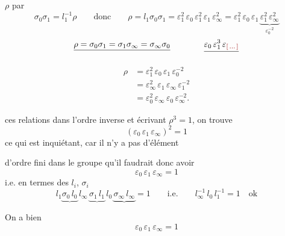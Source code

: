 \documentclass[11pt,a4paper]{article}
\begin{document}
 $\rho$ \struck{\ill{}} par
\[
\sigma_0 \sigma_1 = l_1^{-1} \rho \qquad \text{donc} \qquad
\rho = l_1 \sigma_0 \sigma_1
= \varepsilon_1^2\, \varepsilon_0\, \varepsilon_1^2\, \varepsilon_1\, \varepsilon_\infty^2
= \varepsilon_1^2\, \varepsilon_0\, \varepsilon_1\, \underbrace{\varepsilon_1^2\, \varepsilon_\infty^2}_{\varepsilon_0^{-2}}
\]
\[
\struck{\rho = \sigma_0\sigma_1 = \sigma_1\sigma_\infty = \sigma_\infty\sigma_0}
\qquad\qquad
\struck{\varepsilon_0\, \varepsilon_1^3\, \varepsilon_{\ill{}}}
\]


\[
\begin{aligned}
\rho &= \varepsilon_1^2\, \varepsilon_0\, \varepsilon_1\, \varepsilon_0^{-2} \\
&= \varepsilon_\infty^2\, \varepsilon_1\, \varepsilon_\infty\, \varepsilon_1^{-2} \\
&= \varepsilon_0^2\, \varepsilon_\infty\, \varepsilon_0\, \varepsilon_\infty^{-2}.
\end{aligned}
\]


  ces relations dans l'ordre inverse et
écrivant $\rho^3 = 1$, on trouve
\[
(\varepsilon_0\, \varepsilon_1\, \varepsilon_\infty)^2 = 1
\]
ce qui est inquiétant, car il n'y a pas d'élément


d'ordre fini dans le groupe  \ill{} qu'il
faudrait donc avoir
\[
\varepsilon_0\, \varepsilon_1\, \varepsilon_\infty = 1
\]
i.e. en termes des $l_i$, $\sigma_i$
\[
l_1 \underbrace{\sigma_0\, l_0}\, l_\infty\, \underbrace{\sigma_1\, l_1}\, l_0\, \underbrace{\sigma_\infty\, l_\infty} = 1
\qquad \text{i.e.} \qquad l_\infty^{-1}\, l_0\, l_1^{-1} = 1 \quad \text{ok}
\]


On a bien
\[
\boxed{\varepsilon_0\, \varepsilon_1\, \varepsilon_\infty = 1}
\]
\end{document}

